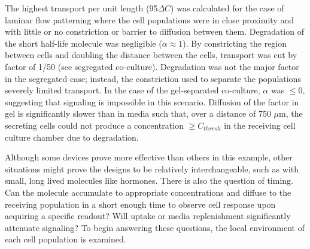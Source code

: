 

The highest transport per unit length (95$\Delta C$) was calculated for the case of laminar flow patterning where the cell populations were in close proximity and with little or no constriction or barrier to diffusion between them. Degradation of the short half-life molecule was negligible ($\alpha \approx 1$). By constricting the region between cells and doubling the distance between the cells, transport was cut by factor of 1/50 (see segregated co-culture). Degradation was not the major factor in the segregated case; instead, the constriction used to separate the populations severely limited transport. In the case of the gel-separated co-culture, $\alpha$ was $\le 0$, suggesting that signaling is impossible in this scenario. Diffusion of the factor in gel is significantly slower than in media such that, over a distance of 750 $\mu$m, the secreting cells could not produce a concentration $\ge C_{thresh}$ in the receiving cell culture chamber due to degradation.

Although some devices prove more effective than others in this example, other situations might prove the designs to be relatively interchangeable, such as with small, long lived molecules like hormones. There is also the question of timing. Can the molecule accumulate to appropriate concentrations and diffuse to the receiving population in a short enough time to observe cell response upon acquiring a specific readout? Will uptake or media replenishment significantly attenuate signaling? To begin answering these questions, the local environment of each cell population is examined.


